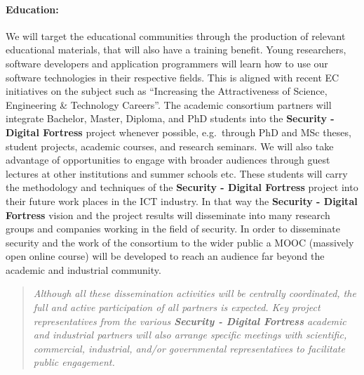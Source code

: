 \documentclass[a4paper,11pt]{article}
\newcommand{\project}[1]{\textbf{#1}\xspace}
\newcommand{\SECURITY}{\project{Security - Digital Fortress}}
\newcommand{\TheProject}{\SECURITY}
\begin{document}
\paragraph{Education:} We will target 
the educational communities through the production of relevant educational materials, that will
also have a training benefit. Young researchers, software
 developers and application programmers will learn how to
 use our software technologies in their
 respective fields. This is aligned with recent EC
 initiatives on the subject such as ``Increasing the Attractiveness
 of Science, Engineering \& Technology Careers''.
 The academic consortium partners will integrate Bachelor,
 Master, Diploma, and PhD students into the \TheProject{}
 project whenever possible, e.g.~through PhD and MSc theses, student
 projects, academic courses, and research seminars. 
 We will also take advantage of opportunities to engage with broader
 audiences through guest lectures at other institutions and summer schools etc.
 These students will
 carry the methodology and techniques of the \TheProject{}
 project into their future work places in the ICT industry.
 In that way the \TheProject{} vision and the project
 results will disseminate into many research groups and
 companies working in the field of security. In order to disseminate security and the work of the consortium to the wider public a MOOC (massively open online course) will be developed to reach an audience far beyond the academic and industrial community.  


\begin{quote}

\emph{Although all these dissemination activities
will be centrally coordinated, the full and active participation of
all partners is expected. Key project representatives from
the various \TheProject{} academic and industrial
partners will also arrange specific meetings
with scientific, commercial, industrial, and/or
governmental representatives to facilitate public
engagement.}
\end{quote}
\end{document}
